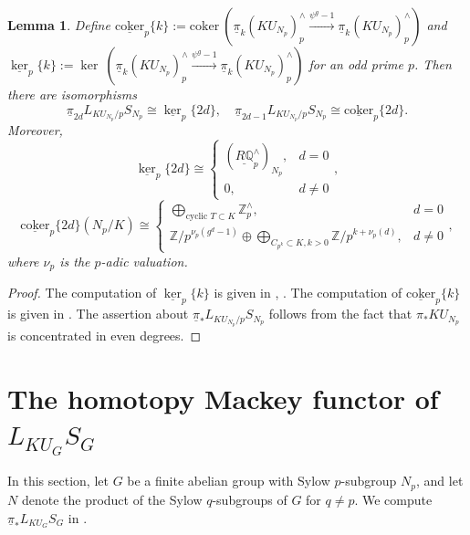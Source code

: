 \documentclass{amsart}
\theoremstyle{plain}
\newtheorem{lemma}[theorem]{Lemma}
\theoremstyle{definition}
\theoremstyle{remark}
\begin{document}
\begin{lemma}\label{lem:psi-1 for odd p}
    Define $\underline{\mathrm{coker}}_p\{k\} := \mathrm{coker}\ ( \underline{\pi}_k (KU_{N_p})_p^{\wedge} \overset{\psi^g-1}{\longrightarrow} \underline{\pi}_k (KU_{N_p})_p^{\wedge})$ and $\underline{\ker}_p\{k\} := \ker\ (\underline{\pi}_k(KU_{N_p})_p^{\wedge} \overset{\psi^g-1}{\longrightarrow} \underline{\pi}_k (KU_{N_p})_p^{\wedge})$ for an odd prime $p$. Then there are isomorphisms
    \[
    \underline{\pi}_{2d}L_{KU_{N_p}/p}S_{N_p}\cong \underline{\ker}_p\{2d\},\quad \underline{\pi}_{2d-1} L_{KU_{N_p}/p}S_{N_p}\cong \underline{\mathrm{coker}}_p\{2d\}.
    \]
    Moreover, 
    $$\underline{\ker}_p\{2d\}\cong\begin{cases}
        (\underline{R\mathbb{Q}}_p^\wedge)_{N_p}, & d=0\\
        0, & d\neq 0
    \end{cases},$$ 
    \[ \underline{\mathrm{coker}}_p\{2d\}(N_p/K)\cong\begin{cases}
        \bigoplus_{\text{cyclic }T\subset K} \mathbb{Z}_p^\wedge, & d=0\\
        \mathbb{Z}/p^{\nu_p(g^d-1)}  \oplus \bigoplus_{C_{p^k}\subset K, k>0} \mathbb{Z}/p^{k+\nu_p(d)}, & d\neq 0
    \end{cases},\]
    where $\nu_p$ is the $p$-adic valuation. 
\end{lemma}
\begin{proof}
   The computation of $\underline{\ker}_p\{k\}$ is given in \cite[Proposition 6.7]{bonventre2022ku_g}, \cite[Corollary 3.5]{carawan2023homotopy}. The computation of $\underline{\mathrm{coker}}_p\{k\}$ is given in \cite[Proposition 3.7]{carawan2023homotopy}. The assertion about $\underline{\pi}_*L_{KU_{N_p}/p}S_{N_p}$ follows from the fact that $\pi_* KU_{N_p}$ is concentrated in even degrees.
\end{proof}


\section{The homotopy Mackey functor of $L_{KU_G}S_G$}\label{Sec:KU_G local sphere}
In this section, let $G$ be a finite abelian group with Sylow $p$-subgroup $N_p$, and let $N$ denote the product of the Sylow $q$-subgroups of $G$ for $q\neq p$. We compute $\underline{\pi}_*L_{KU_G}S_G$ in .
\end{document}
